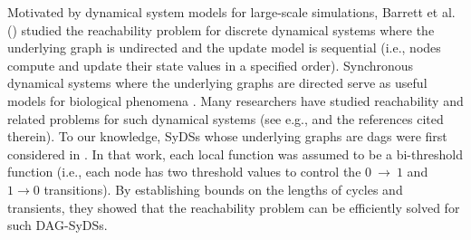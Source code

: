 Motivated by dynamical system models for large-scale simulations,
Barrett et al. (\citeyear{BH+06}) studied the reachability problem
for discrete dynamical systems where the underlying graph is 
undirected and the update model is sequential (i.e., nodes compute 
and update their state values in a specified order). 
Synchronous dynamical systems where the underlying graphs
are directed serve as useful models for biological
phenomena \cite{Kauffman-etal-2003}.
Many researchers have studied reachability and related 
problems for such dynamical systems (see e.g., 
\cite{OU-2020,OU-2017,Akutsu-etal-2007} and
the references cited therein).
To our knowledge, SyDSs whose underlying graphs are dags
were first considered in \cite{KKM+2013}. 
In that work, each local function was assumed to be
a bi-threshold function (i.e., each node has two threshold
values to control the $0 ~\rightarrow~  1$ and $1 \rightarrow 0$
transitions).
By establishing bounds on the lengths of cycles and transients,
they showed that the reachability problem can be efficiently
solved for such DAG-SyDSs.


